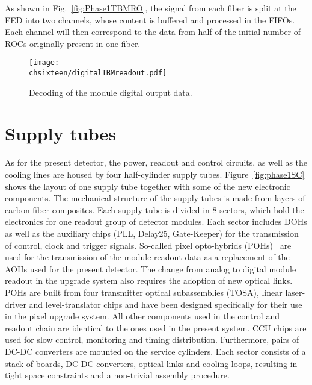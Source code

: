 As shown in Fig.~\ref{fig:Phase1TBMRO}, the signal from each fiber is split at the FED into two channels, whose content is buffered and processed in the FIFOs.
Each channel will then correspond to the data from half of the initial number of ROCs originally present in one fiber.

\clearpage

\begin{figure}[!htb]
 \begin{center}
 \texttt{[image: \\chsixteen/digitalTBMreadout.pdf]}
 \end{center}
 \caption{Decoding of the module digital output data.}
 \label{fig:digTBMRO}
\end{figure}

\section{Supply tubes}

As for the present detector, the power, readout and control circuits, as well as the cooling lines are housed by four half-cylinder supply tubes.
Figure~\ref{fig:phase1SC} shows the layout of one supply tube together with some of the new electronic components.
The mechanical structure of the supply tubes is made from layers of carbon fiber composites.
Each supply tube is divided in 8 sectors, which hold the electronics for one readout group of detector modules.
Each sector includes DOHs as well as the auxiliary chips (PLL, Delay25, Gate-Keeper) for the transmission of control, clock and trigger signals.
So-called pixel opto-hybrids (POHs)~\cite{1748-0221-7-01-C01113} are used for the transmission of the module readout data as a replacement of the AOHs used for the present detector.
The change from analog to digital module readout in the upgrade system also requires the adoption of new optical links.
POHs are built from four transmitter optical subassemblies (TOSA), linear laser-driver and level-translator chips and have been designed specifically for their use in the pixel upgrade system.
All other components used in the control and readout chain are identical to the ones used in the present system. CCU chips are used for slow control, monitoring and timing distribution.
Furthermore, pairs of DC-DC converters are mounted on the service cylinders.
Each sector consists of a stack of boards, DC-DC converters, optical links and cooling loops, resulting in tight space constraints and a non-trivial assembly procedure.

